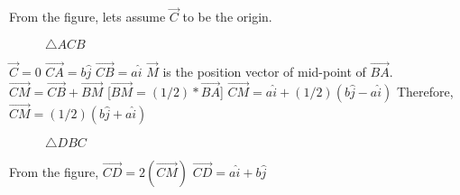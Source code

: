 
From the figure, lets assume $\vec{C}$ to be the origin.
\newline
\begin{figure}[H]

\caption{$\triangle ACB$}
\end{figure}
$\vec{C}=0$
\newline
$\vec{CA}=b\hat{j}$
\newline
$\vec{CB}=a\hat{i}$
\newline
$\vec{M}$ is the position vector of mid-point of $\vec{BA}$.
\newline
$\vec{CM} = \vec{CB}+\vec{BM}$ [$\vec{BM}=(1/2)*\vec{BA}$]
\newline
$\vec{CM} = a\hat{i}+(1/2)(b\hat{j}-a\hat{i})$
\newline
Therefore, $\vec{CM}=(1/2)(b\hat{j}+a\hat{i})$
\newline
\begin{figure}[H]

\caption{$\triangle DBC$}
\end{figure}
From the figure, $\vec{CD}=2(\vec{CM})$
\newline
$\vec{CD}=a\hat{i}+b\hat{j}$
